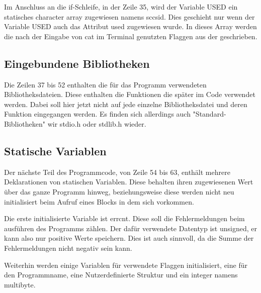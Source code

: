 {Im Anschluss an die if-Schleife, in der Zeile 35, wird der Variable USED ein statisches character array zugewiesen namens sccsid.
Dies geschieht nur wenn der Variable USED auch das Attribut used zugewiesen wurde.
In dieses Array werden die nach der Eingabe von cat im Terminal genutzten Flaggen aus der geschrieben.

\subsection{Eingebundene Bibliotheken}
Die Zeilen 37 bis 52 enthalten die für das Programm verwendeten Bibliotheksdateien.
Diese enthalten die Funktionen die später im Code verwendet werden.
Dabei soll hier jetzt nicht auf jede einzelne Bibliotheksdatei und deren Funktion eingegangen werden.
Es finden sich allerdings auch "Standard-Bibliotheken" wir stdio.h oder stdlib.h wieder.

\subsection{Statische Variablen}
Der nächste Teil des Programmcode, von Zeile 54 bis 63, enthält mehrere Deklarationen von statischen Variablen.
Diese behalten ihren zugewiesenen Wert über das ganze Programm hinweg, beziehungsweise diese  werden nicht neu initialisiert beim Aufruf eines Blocks in dem sich vorkommen. \par
Die erste initialisierte Variable ist errcnt.
Diese soll die Fehlermeldungen beim ausführen des Programms zählen.
Der dafür verwendete Datentyp ist unsigned, er kann also nur positive Werte speichern.
Dies ist auch sinnvoll, da die Summe der Fehlermeldungen nicht negativ sein kann. \par
Weiterhin werden einige Variablen für verwendete Flaggen initialisiert, eine für den Programmname, eine Nutzerdefinierte Struktur und ein integer namens multibyte.\par

}
